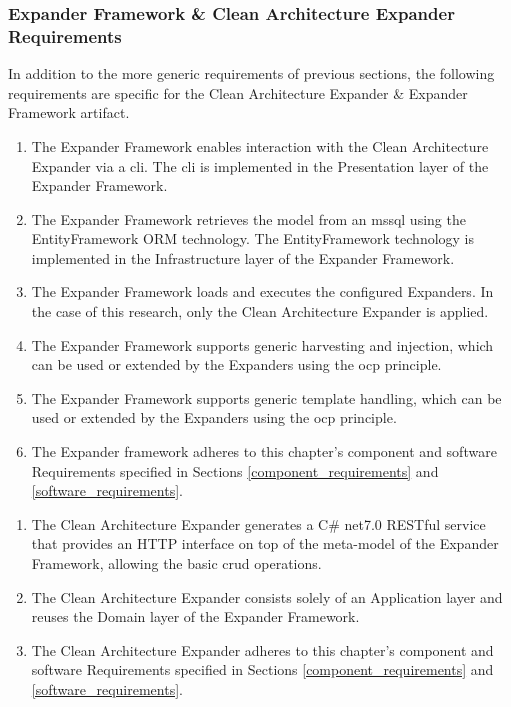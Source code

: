 \subsubsection{Expander Framework \& Clean Architecture Expander Requirements} \label{expander_framework_requirements}

In addition to the more generic requirements of previous sections, the following
requirements are specific for the Clean Architecture Expander \& Expander Framework artifact.

\begin{enumerate}[label=\themycounter.\arabic*]
    \item The Expander Framework enables interaction with the Clean Architecture Expander via a
    \gls{cli}. The \gls{cli} is implemented in the Presentation layer of the
    Expander Framework.
    \item The Expander Framework retrieves the model from an \gls{mssql} using the
    EntityFramework ORM technology. The EntityFramework technology is implemented in the
    Infrastructure layer of the Expander Framework.
    \item The Expander Framework loads and executes the configured Expanders. In the case of
    this research, only the Clean Architecture Expander is applied.
    \item The Expander Framework supports generic harvesting and injection, which can be
    used or extended by the Expanders using the \gls{ocp} principle.
    \item The Expander Framework supports generic template handling, which can be used or
    extended by the Expanders using the \gls{ocp} principle.
    \item The Expander framework adheres to this chapter's component and software Requirements
    specified in Sections \ref{component_requirements} and \ref{software_requirements}.
\end{enumerate}

\begin{enumerate}[label=\themycounter.\arabic*]
    \item The Clean Architecture Expander generates a C\# net7.0 RESTful service that provides an
    HTTP interface on top of the meta-model of the Expander Framework, allowing the basic
    \gls{crud} operations.
    \item The Clean Architecture Expander consists solely of an Application layer and reuses
    the Domain layer of the Expander Framework.
    \item The Clean Architecture Expander adheres to this chapter's component and software
    Requirements specified in Sections \ref{component_requirements} and
    \ref{software_requirements}.
\end{enumerate}
